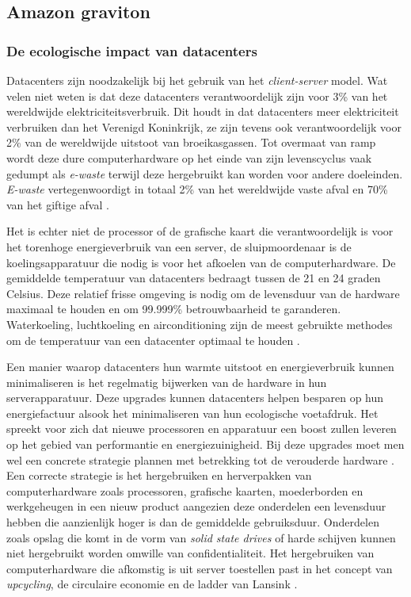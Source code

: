 \subsection{Amazon graviton}
\subsubsection{De ecologische impact van datacenters}
Datacenters zijn noodzakelijk bij het gebruik van het \textit{client-server} model. Wat velen niet weten is dat deze datacenters verantwoordelijk zijn voor 3\% van het wereldwijde elektriciteitsverbruik. Dit houdt in dat datacenters meer elektriciteit verbruiken dan het Verenigd Koninkrijk, ze zijn tevens ook verantwoordelijk voor 2\% van de wereldwijde uitstoot van broeikasgassen. Tot overmaat van ramp wordt deze dure computerhardware op het einde van zijn levenscyclus vaak gedumpt als \textit{e-waste} terwijl deze hergebruikt kan worden voor andere doeleinden. \textit{E-waste} vertegenwoordigt in totaal 2\% van het wereldwijde vaste afval en 70\% van het giftige afval \autocite{Supermicro2018}.

Het is echter niet de processor of de grafische kaart die verantwoordelijk is voor het torenhoge energieverbruik van een server, de sluipmoordenaar is de koelingsapparatuur die nodig is voor het afkoelen van de computerhardware. De gemiddelde temperatuur van datacenters bedraagt tussen de 21 en 24 graden Celsius. Deze relatief frisse omgeving is nodig om de levensduur van de hardware maximaal te houden en om 99.999\% betrouwbaarheid te garanderen. Waterkoeling, luchtkoeling en airconditioning zijn de meest gebruikte methodes om de temperatuur van een datacenter optimaal te houden \autocite{Miller2022}.

Een manier waarop datacenters hun warmte uitstoot en energieverbruik kunnen minimaliseren is het regelmatig bijwerken van de hardware in hun serverapparatuur. Deze upgrades kunnen datacenters helpen besparen op hun energiefactuur alsook het minimaliseren van hun ecologische voetafdruk. Het spreekt voor zich dat nieuwe processoren en apparatuur een boost zullen leveren op het gebied van performantie en energiezuinigheid. Bij deze upgrades moet men wel een concrete strategie plannen met betrekking tot de verouderde hardware \autocite{Supermicro2018}. Een correcte strategie is het hergebruiken en herverpakken van computerhardware zoals processoren, grafische kaarten, moederborden en werkgeheugen in een nieuw product aangezien deze onderdelen een levensduur hebben die aanzienlijk hoger is dan de gemiddelde gebruiksduur. Onderdelen zoals opslag die komt in de vorm van \textit{solid state drives} of harde schijven kunnen niet hergebruikt worden omwille van confidentialiteit. Het hergebruiken van computerhardware die afkomstig is uit server toestellen past in het concept van \textit{upcycling}, de circulaire economie en de ladder van Lansink \autocite{VanAcker2017}.

